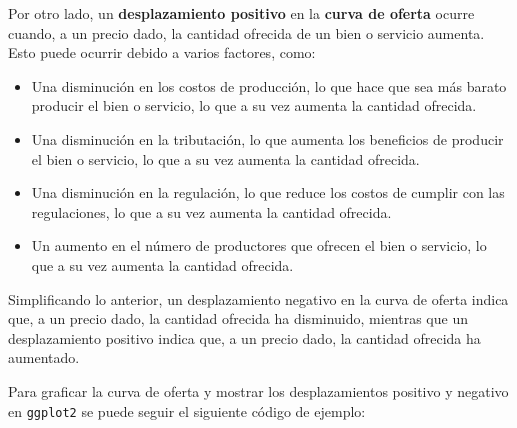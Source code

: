 \documentclass[
  spanish,
  12pt,
]{book}
\providecommand{\tightlist}{%
  \setlength{\itemsep}{0pt}\setlength{\parskip}{0pt}}
\begin{document}
Por otro lado, un \textbf{desplazamiento positivo} en la \textbf{curva
de oferta} ocurre cuando, a un precio dado, la cantidad ofrecida de un
bien o servicio aumenta. Esto puede ocurrir debido a varios factores,
como:

\begin{itemize}
\tightlist
\item
  Una disminución en los costos de producción, lo que hace que sea más
  barato producir el bien o servicio, lo que a su vez aumenta la
  cantidad ofrecida.
\item
  Una disminución en la tributación, lo que aumenta los beneficios de
  producir el bien o servicio, lo que a su vez aumenta la cantidad
  ofrecida.
\item
  Una disminución en la regulación, lo que reduce los costos de cumplir
  con las regulaciones, lo que a su vez aumenta la cantidad ofrecida.
\item
  Un aumento en el número de productores que ofrecen el bien o servicio,
  lo que a su vez aumenta la cantidad ofrecida.
\end{itemize}

Simplificando lo anterior, un desplazamiento negativo en la curva de
oferta indica que, a un precio dado, la cantidad ofrecida ha disminuido,
mientras que un desplazamiento positivo indica que, a un precio dado, la
cantidad ofrecida ha aumentado.

Para graficar la curva de oferta y mostrar los desplazamientos positivo
y negativo en \texttt{ggplot2} se puede seguir el siguiente código de
ejemplo:

\newpage
\end{document}
